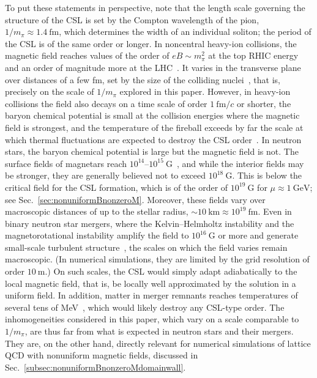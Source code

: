 \documentclass[pdflatex,iicol,sn-mathphys-num]{sn-jnl}
\let\m=\mu
\begin{document}
To put these statements in perspective, note that the length scale governing the structure of the CSL is set by the Compton wavelength of the pion, $1/m_\pi\approx1.4~\text{fm}$, which determines the width of an individual soliton; the period of the CSL is of the same order or longer. In noncentral heavy-ion collisions, the magnetic field reaches values of the order of $eB\sim m_\pi^2$ at the top RHIC energy and an order of magnitude more at the LHC~\cite{Kharzeev:2007jp,Skokov:2009qp,Deng:2012pc}. It varies in the transverse plane over distances of a few fm, set by the size of the colliding nuclei~\cite{Deng:2012pc}, that is, precisely on the scale of $1/m_\pi$ explored in this paper. However, in heavy-ion collisions the field also decays on a time scale of order $1~\text{fm}/c$ or shorter, the baryon chemical potential is small at the collision energies where the magnetic field is strongest, and the temperature of the fireball exceeds by far the scale at which thermal fluctuations are expected to destroy the CSL order~\cite{Brauner:2021sci,Brauner:2023ort}. In neutron stars, the baryon chemical potential is large but the magnetic field is not. The surface fields of magnetars reach $10^{14}$--$10^{15}~\text{G}$~\cite{Kaspi:2017fwg}, and while the interior fields may be stronger, they are generally believed not to exceed $10^{18}~\text{G}$. This is below the critical field for the CSL formation, which is of the order of $10^{19}~\text{G}$ for $\m\approx1~\text{GeV}$; see Sec.~\ref{sec:nonuniformBnonzeroM}. Moreover, these fields vary over macroscopic distances of up to the stellar radius, $\sim10~\text{km}\approx10^{19}~\text{fm}$. Even in binary neutron star mergers, where the Kelvin--Helmholtz instability and the magnetorotational instability amplify the field to $10^{16}~\text{G}$ or more and generate small-scale turbulent structure~\cite{Price:2006fi,Kiuchi:2015sga}, the scales on which the field varies remain macroscopic. (In numerical simulations, they are limited by the grid resolution of order $10~\text{m}$.) On such scales, the CSL would simply adapt adiabatically to the local magnetic field, that is, be locally well approximated by the solution in a uniform field. In addition, matter in merger remnants reaches temperatures of several tens of MeV~\cite{Perego:2019adq}, which would likely destroy any CSL-type order. The inhomogeneities considered in this paper, which vary on a scale comparable to $1/m_\pi$, are thus far from what is expected in neutron stars and their mergers. They are, on the other hand, directly relevant for numerical simulations of lattice QCD with nonuniform magnetic fields, discussed in Sec.~\ref{subsec:nonuniformBnonzeroMdomainwall}.
\end{document}
